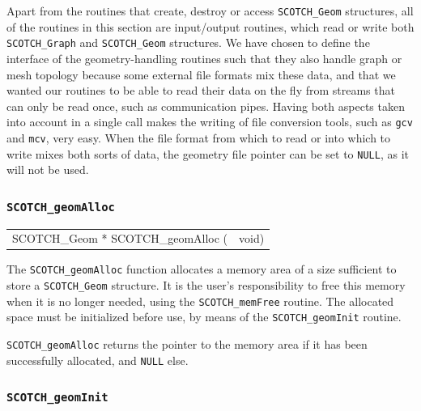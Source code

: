 Apart from the routines that create, destroy or access
{\tt SCOTCH\_\lbt Geom} structures, all of the routines
in this section are input/output routines, which read or
write both {\tt SCOTCH\_\lbt Graph} and {\tt SCOTCH\_\lbt Geom}
structures. We have chosen to define the interface of the
geometry-handling routines such that they also handle
graph or mesh topology because some external file formats
mix these data, and that we wanted our routines to be able
to read their data on the fly from streams that can only be
read once, such as communication pipes. Having both aspects
taken into account in a single call makes the writing of
file conversion tools, such as {\tt gcv} and {\tt mcv},
very easy. When the file format from which to read or into
which to write mixes both sorts of data, the geometry file
pointer can be set to {\tt NULL}, as it will not be used.

\subsubsection{{\tt SCOTCH\_geomAlloc}}

\begin{itemize}
\progsyn

{\tt\begin{tabular}{l@{}l}
SCOTCH\_Geom * SCOTCH\_geomAlloc ( & void)
\end{tabular}}

\progdes

The {\tt SCOTCH\_geomAlloc} function allocates a memory area of a
size sufficient to store a {\tt SCOTCH\_\lbt Geom} structure. It is
the user's responsibility to free this memory when it is no longer
needed, using the {\tt SCOTCH\_\lbt mem\lbt Free} routine. The
allocated space must be initialized before use, by means of the
{\tt SCOTCH\_\lbt geom\lbt Init} routine.

\progret

{\tt SCOTCH\_geomAlloc} returns the pointer to the memory area if it
has been successfully allocated, and {\tt NULL} else.
\end{itemize}

\subsubsection{{\tt SCOTCH\_geomInit}}
\label{sec-lib-func-geominit}

